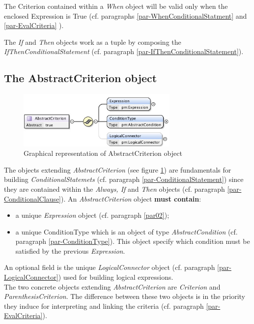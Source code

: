 \documentclass[a4paper,11pt] {ivoa}
\begin{document}
The Criterion contained within a {\it When} object will be valid only when the enclosed Expression
is True (cf. paragraphs \ref{par-WhenConditionalStatment} and \ref{par-EvalCriteria} ).

The {\it If} and {\it Then} objects work as a tuple by composing the  {\it
IfThenConditionalStatement} (cf. paragraph
\ref{par-IfThenConditionalStatement}).

\subsection{The AbstractCriterion object}\label{par-AbstractCriterion}
\begin{figure}[htbp]
\begin{center}
\includegraphics[width=0.7\textwidth]{pictures/AbstractCriterion.jpg} 
\caption{Graphical representation of AbstractCriterion object}
\label{Pic-AbstractCriterion}
\end{center}
\end{figure}
The objects extending {\it AbstractCriterion} (see figure \ref{Pic-AbstractCriterion}) are
fundamentals for building {\it ConditionalStatemets} (cf. paragraph \ref{par-ConditionalStatement})
since they are contained within the {\it Always, If} and {\it Then} objects (cf. paragraph
\ref{par-ConditionalClause}).
An {\it AbstractCriterion} object {\bf must contain}:
\begin{itemize}
\item a unique {\it Expression} object (cf. paragraph \ref{par02});
\item a unique ConditionType which is an object of type {\it AbstractCondition} (cf. paragraph 
\ref{par-ConditionType}).
This object specify which condition must be satisfied by the previous {\it Expression}.
\end{itemize}
An optional field is the unique {\it LogicalConnector} object (cf. paragraph
\ref{par-LogicalConnector}) used for building logical expressions.\\
The two concrete objects extending  {\it AbstractCriterion}  are {\it Criterion} and {\it
ParenthesisCriterion}.  The difference between these two objects is in the priority they induce for
interpreting and linking the criteria (cf. paragraph \ref{par-EvalCriteria}).
\end{document}
